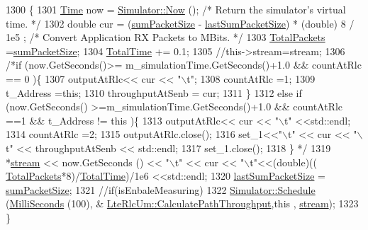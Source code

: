 \begin{DoxyCode}
1300                              \{
1301          \hyperlink{namespacens3_1_1TracedValueCallback_a7ffd3e7c142ffe7c8a1d2db9b8de38ec}{Time} now = \hyperlink{classns3_1_1Simulator_ac3178fa975b419f7875e7105be122800}{Simulator::Now} ();                                         \textcolor{comment}{/* Return
       the simulator's virtual time. */}
1302           \textcolor{keywordtype}{double} cur = (\hyperlink{classns3_1_1LteRlcUm_aa873d03add0bb0b7d5a9ac3224685fd2}{sumPacketSize} - \hyperlink{classns3_1_1LteRlcUm_a015feff20aa27cbdb84c18fbdb482027}{lastSumPacketSize}) * (\textcolor{keywordtype}{double}) 8 / 1e5
      ;     \textcolor{comment}{/* Convert Application RX Packets to MBits. */}
1303         \hyperlink{classns3_1_1LteRlcUm_aa73359807fbf8026a89c765b619e0e30}{TotalPackets} =\hyperlink{classns3_1_1LteRlcUm_aa873d03add0bb0b7d5a9ac3224685fd2}{sumPacketSize};
1304         \hyperlink{classns3_1_1LteRlcUm_a94d9298d5b49e9f301caacf6c849eacc}{TotalTime} += 0.1;
1305         \textcolor{comment}{//this->stream=stream;}
1306         \textcolor{comment}{/*if (now.GetSeconds()>= m\_simulationTime.GetSeconds()+1.0 && countAtRlc == 0 )\{}
1307 \textcolor{comment}{                outputAtRlc<< cur << "\(\backslash\)t";}
1308 \textcolor{comment}{                countAtRlc =1;}
1309 \textcolor{comment}{                t\_Address =this;}
1310 \textcolor{comment}{                throughputAtSenb = cur;}
1311 \textcolor{comment}{        \}}
1312 \textcolor{comment}{        else if (now.GetSeconds() >=m\_simulationTime.GetSeconds()+1.0 && countAtRlc ==1 && t\_Address !=
       this )\{}
1313 \textcolor{comment}{                outputAtRlc<< cur << "\(\backslash\)t" <<std::endl;}
1314 \textcolor{comment}{                countAtRlc =2;}
1315 \textcolor{comment}{                outputAtRlc.close();}
1316 \textcolor{comment}{                set\_1<<"\(\backslash\)t" << cur << "\(\backslash\)t" << throughputAtSenb << std::endl;}
1317 \textcolor{comment}{            set\_1.close();}
1318 \textcolor{comment}{        \} */}
1319           *\hyperlink{classns3_1_1LteRlcUm_a8509783beb5d5625757bdf93549079f6}{stream} << now.GetSeconds () << \textcolor{stringliteral}{"\(\backslash\)t"} << cur << \textcolor{stringliteral}{"\(\backslash\)t"}<<(double)((
      \hyperlink{classns3_1_1LteRlcUm_aa73359807fbf8026a89c765b619e0e30}{TotalPackets}*8)/\hyperlink{classns3_1_1LteRlcUm_a94d9298d5b49e9f301caacf6c849eacc}{TotalTime})/1e6 <<std::endl;
1320           \hyperlink{classns3_1_1LteRlcUm_a015feff20aa27cbdb84c18fbdb482027}{lastSumPacketSize} = \hyperlink{classns3_1_1LteRlcUm_aa873d03add0bb0b7d5a9ac3224685fd2}{sumPacketSize};
1321           \textcolor{comment}{//if(isEnbaleMeasuring)}
1322           \hyperlink{classns3_1_1Simulator_a671882c894a08af4a5e91181bf1eec13}{Simulator::Schedule} (\hyperlink{group__timecivil_gaf26127cf4571146b83a92ee18679c7a9}{MilliSeconds} (100), &
      \hyperlink{classns3_1_1LteRlcUm_a54fff036c0cfaf8a314a375578f410bc}{LteRlcUm::CalculatePathThroughput},\textcolor{keyword}{this} , \hyperlink{classns3_1_1LteRlcUm_a8509783beb5d5625757bdf93549079f6}{stream});
1323 \}
\end{DoxyCode}


